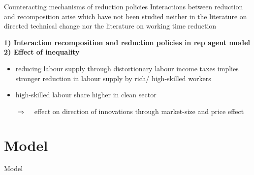 \documentclass[11pt,aspectratio=169]{beamer}
\newcommand{\ar}{$\Rightarrow$ \ }
\begin{document}
\begin{frame}{Counteracting mechanisms of reduction policies}
	Interactions between reduction and recomposition arise which have not been studied neither in the literature on directed technical change nor the literature on working time reduction
	
	\textbf{1) Interaction recomposition and reduction policies in rep agent model}\\
	\textbf{2) Effect of inequality}
	\begin{itemize}
		\item reducing labour supply through distortionary labour income taxes implies stronger reduction in labour supply by rich/ high-skilled workers
		\item high-skilled labour share higher in clean sector \cite{Consoli2016DoCapital}
		\item[\ar] effect on direction of innovations through market-size and  price effect
	\end{itemize}
\end{frame}

\section{Model}
\begin{frame}{Model}
\end{frame}
\end{document}
